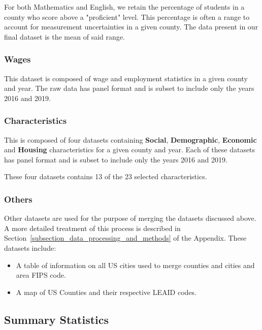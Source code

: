 For both Mathematics and English, we retain the percentage of students in a county who score above a "proficient" level. This percentage is often a range to account for measurement uncertainties in a given county. The data present in our final dataset is the mean of said range.

\subsubsection{Wages}
This dataset is composed of wage and employment statistics in a given county and year. The raw data has panel format and is subset to include only the years 2016 and 2019.

\subsubsection{Characteristics}
This is composed of four datasets containing \textbf{Social}, \textbf{Demographic}, \textbf{Economic} and \textbf{Housing} characteristics for a given county and year. Each of these datasets has panel format and is subset to include only the years 2016 and 2019. 

These four datasets contains 13 of the 23 selected characteristics.

\subsubsection{Others} 

Other datasets are used for the purpose of merging the datasets discussed above. A more detailed treatment of this process is described in Section~\ref{subsection_data_processing_and_methods} of the Appendix. These datasets include:

\begin{itemize}

    \item A table of information on all US cities used to merge counties and cities and area FIPS code.

    \item A map of US Counties and their respective LEAID codes.

\end{itemize}

\subsection{Summary Statistics}\label{subsection_summary_statistics}


